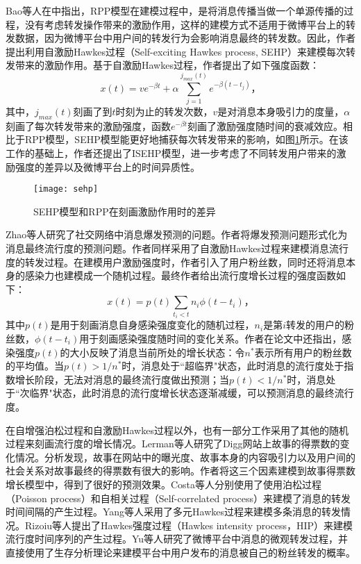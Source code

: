 Bao等人在\citep{bao2015modeling}中指出，RPP模型在建模过程中，是将消息传播当做一个单源传播的过程，没有考虑转发操作带来的激励作用，这样的建模方式不适用于微博平台上的转发数据，因为微博平台中用户间的转发行为会影响消息最终的转发数。因此，作者提出利用自激励Hawkes过程（Self-exciting Hawkes process, SEHP）来建模每次转发带来的激励作用。基于自激励Hawkes过程，作者提出了如下强度函数：
\begin{equation}
\label{eq:hawkesIntensity}
x(t)=v e^{-\beta t}+\alpha \sum_{j=1}^{j_{max}(t)} e^{-\beta(t-t_j)}\text{，}
\end{equation}
其中，$j_{max}(t)$刻画了到$t$时刻为止的转发次数，$v$是对消息本身吸引力的度量，$\alpha$刻画了每次转发带来的激励强度，函数$e^{-\beta t}$刻画了激励强度随时间的衰减效应。相比于RPP模型，SEHP模型能更好地捕获每次转发带来的影响，如图\ref{fig:sehp}所示。在该工作的基础上，作者还提出了ISEHP模型\citep{bao2016modeling}，进一步考虑了不同转发用户带来的激励强度的差异以及微博平台上的时间异质性。
\begin{figure}[!htbp]
  \centering
  \texttt{[image: sehp]}
  \caption{SEHP模型和RPP在刻画激励作用时的差异\citep{bao2015modeling}}
  \label{fig:sehp}
\end{figure}

Zhao等人\citep{zhao2015seismic}研究了社交网络中消息爆发预测的问题。作者将爆发预测问题形式化为消息最终流行度的预测问题。作者同样采用了自激励Hawkes过程来建模消息流行度的转发过程。在建模用户激励强度时，作者引入了用户粉丝数，同时还将消息本身的感染力也建模成一个随机过程。最终作者给出流行度增长过程的强度函数如下：
\begin{equation}
\label{eq:seismic}
x(t)=p(t) \sum_{t_i<t}n_i \phi(t-t_i)\text{，}
\end{equation}
其中$p(t)$是用于刻画消息自身感染强度变化的随机过程，$n_i$是第$i$转发的用户的粉丝数，$\phi(t-t_i)$用于刻画感染强度随时间的变化关系。作者在论文中还指出，感染强度$p(t)$的大小反映了消息当前所处的增长状态：令$n^{\ast}$表示所有用户的粉丝数的平均值。当$p(t)>1/n^{\ast}$时，消息处于``超临界"状态，此时消息的流行度处于指数增长阶段，无法对消息的最终流行度做出预测；当$p(t)<1/n^{\ast}$时，消息处于``次临界"状态，此时消息的流行度增长状态逐渐减缓，可以预测消息的最终流行度。

在自增强泊松过程和自激励Hawkes过程以外，也有一部分工作采用了其他的随机过程来刻画流行度的增长情况。Lerman等人\citep{lerman2010using}研究了Digg网站上故事的得票数的变化情况。分析发现，故事在网站中的曝光度、故事本身的内容吸引力以及用户间的社会关系对故事最终的得票数有很大的影响。作者将这三个因素建模到故事得票数增长模型中，得到了很好的预测效果。Costa等人\citep{ferraz2015rsc}分别使用了使用泊松过程（Poisson process）\citep{kingman1993poisson}和自相关过程（Self-correlated process）来建模了消息的转发时间间隔的产生过程。Yang等人\citep{yang2013mixture}采用了多元Hawkes过程来建模多条消息的转发情况。Rizoiu等人\citep{rizoiu2017expecting}提出了Hawkes强度过程（Hawkes intensity process，HIP）来建模流行度时间序列的产生过程。Yu等人\citep{yu2015micro}研究了微博平台中消息的微观转发过程，并直接使用了生存分析理论来建模平台中用户发布的消息被自己的粉丝转发的概率。

